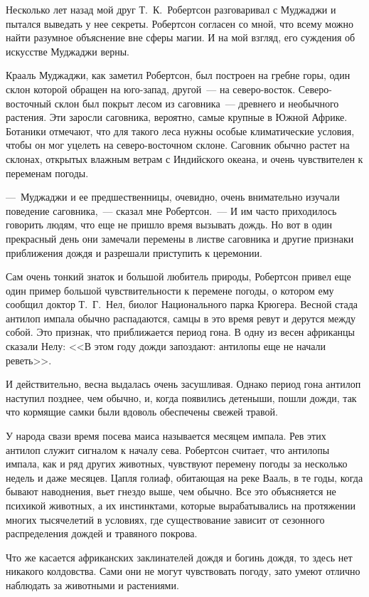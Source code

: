 \documentclass[12pt,a4paper,twoside,openany,svgnames]{memoir}
\begin{document}
Несколько лет назад мой друг Т.~К.~Робертсон разговаривал с Муджаджи и пытался выведать у нее секреты. Робертсон согласен со мной, что всему можно найти разумное объяснение вне сферы магии. И на мой взгляд, его суждения об искусстве Муджаджи верны.

Крааль Муджаджи, как заметил Робертсон, был построен на гребне горы, один склон которой обращен на юго-запад, другой~--- на северо-восток. Северо-восточный склон был покрыт лесом из саговника~--- древнего и необычного растения. Эти заросли саговника, вероятно, самые крупные в Южной Африке. Ботаники отмечают, что для такого леса нужны особые климатические условия, чтобы он мог уцелеть на северо-восточном склоне. Саговник обычно растет на склонах, открытых влажным ветрам с Индийского океана, и очень чувствителен к переменам погоды.

---~Муджаджи и ее предшественницы, очевидно, очень внимательно изучали поведение саговника,~--- сказал мне Робертсон.~--- И им часто приходилось говорить людям, что еще не пришло время вызывать дождь. Но вот в один прекрасный день они замечали перемены в листве саговника и другие признаки приближения дождя и разрешали приступить к церемонии.

Сам очень тонкий знаток и большой любитель природы, Робертсон привел еще один пример большой чувствительности к перемене погоды, о котором ему сообщил доктор Т.~Г.~Нел, биолог Национального парка Крюгера. Весной стада антилоп импала обычно распадаются, самцы в это время ревут и дерутся между собой. Это признак, что приближается период гона. В одну из весен африканцы сказали Нелу: <<В этом году дожди запоздают: антилопы еще не начали реветь>>.

И действительно, весна выдалась очень засушливая. Однако период гона антилоп наступил позднее, чем обычно, и, когда появились детеныши, пошли дожди, так что кормящие самки были вдоволь обеспечены свежей травой.

У народа свази время посева маиса называется месяцем импала. Рев этих антилоп служит сигналом к началу сева. Робертсон считает, что антилопы импала, как и ряд других животных, чувствуют перемену погоды за несколько недель и даже месяцев. Цапля голиаф, обитающая на реке Вааль, в те годы, когда бывают наводнения, вьет гнездо выше, чем обычно. Все это объясняется не психикой животных, а их инстинктами, которые вырабатывались на протяжении многих тысячелетий в условиях, где существование зависит от сезонного распределения дождей и травяного покрова.

Что же касается африканских заклинателей дождя и богинь дождя, то здесь нет никакого колдовства. Сами они не могут чувствовать погоду, зато умеют отлично наблюдать за животными и растениями.
\end{document}
